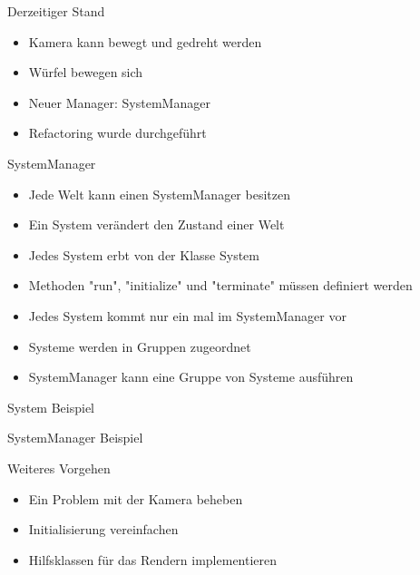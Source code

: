 \documentclass{../presentation}
\begin{document}
\frame[plain]{\titlepage}

\begin{frame}{Derzeitiger Stand}
    \begin{itemize}
        \item Kamera kann bewegt und gedreht werden
        \item Würfel bewegen sich
        \item Neuer Manager: SystemManager
        \item Refactoring wurde durchgeführt
    \end{itemize}
\end{frame}

\begin{frame}{SystemManager}
    \begin{itemize}
        \item Jede Welt kann einen SystemManager besitzen
        \item Ein System verändert den Zustand einer Welt
        \item Jedes System erbt von der Klasse System
        \item Methoden "run", "initialize" und "terminate" müssen definiert werden
        \item Jedes System kommt nur ein mal im SystemManager vor
        \item Systeme werden in Gruppen zugeordnet
        \item SystemManager kann eine Gruppe von Systeme ausführen
    \end{itemize}
\end{frame}

\begin{frame}{System Beispiel}
    
\end{frame}

\begin{frame}{SystemManager Beispiel}
    
\end{frame}

\begin{frame}{Weiteres Vorgehen}
    \begin{itemize}
        \item Ein Problem mit der Kamera beheben
        \item Initialisierung vereinfachen
        \item Hilfsklassen für das Rendern implementieren
    \end{itemize}
\end{frame}
\end{document}
